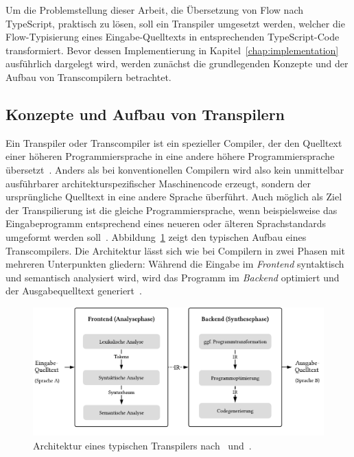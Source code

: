 Um die Problemstellung dieser Arbeit, die Übersetzung von Flow nach TypeScript, praktisch zu lösen, soll ein Transpiler umgesetzt werden, welcher die Flow-Typisierung eines Eingabe-Quelltexts in entsprechenden TypeScript-Code transformiert. Bevor dessen Implementierung in Kapitel~\ref{chap:implementation} ausführlich dargelegt wird, werden zunächst die grundlegenden Konzepte und der Aufbau von Transcompilern betrachtet.

\subsection{Konzepte und Aufbau von Transpilern}
\label{sec:transpiler-concepts}

Ein Transpiler oder Transcompiler ist ein spezieller Compiler, der den Quelltext einer höheren Programmiersprache in eine andere höhere Programmiersprache übersetzt~\autocite[3]{AHO:COMPILERS}. Anders als bei konventionellen Compilern wird also kein unmittelbar ausführbarer architekturspezifischer Maschinencode erzeugt, sondern der ursprüngliche Quelltext in eine andere Sprache überführt. Auch möglich als Ziel der Transpilierung ist die gleiche Programmiersprache, wenn beispielsweise das Eingabeprogramm entsprechend eines neueren oder älteren Sprachstandards umgeformt werden soll~\autocite{EVGENIY:2016}. Abbildung~\ref{fig:transpiler-architecture} zeigt den typischen Aufbau eines Transcompilers. Die Architektur lässt sich wie bei Compilern in zwei Phasen mit mehreren Unterpunkten gliedern: Während die Eingabe im \emph{Frontend} syntaktisch und semantisch analysiert wird, wird das Programm im \emph{Backend} optimiert und der Ausgabequelltext generiert~\autocite[136]{APPEL:2003}.

\begin{figure}[htb]
  \includegraphics[width=\textwidth]{src/2_Grundlagen/fig/transpiler-architecture.pdf}
  \caption{Architektur eines typischen Transpilers nach~\autocite{EVGENIY:2016} und~\autocite[8]{TORCZON:2007}.}
	\label{fig:transpiler-architecture}
\end{figure}

